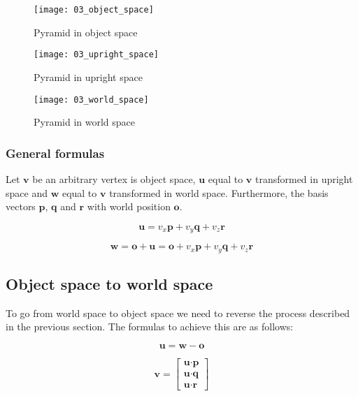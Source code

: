 \begin{figure}[H]
\centering
    \texttt{[image: 03\_object\_space]}
\caption{Pyramid in object space}
\label{fig:pyramid-object-space}
\end{figure}

\begin{figure}[H]
\centering
    \texttt{[image: 03\_upright\_space]}
\caption{Pyramid in upright space}
\label{fig:pyramid-upright-space}
\end{figure}

\begin{figure}[H]
\centering
    \texttt{[image: 03\_world\_space]}
\caption{Pyramid in world space}
\label{fig:pyramid-world-space}
\end{figure}

\subsubsection{General formulas}

Let $\textbf{v}$ be an arbitrary vertex is object space, $\textbf{u}$ equal to $\textbf{v}$ transformed in upright space and $\textbf{w}$ equal to $\textbf{v}$ transformed in world space. Furthermore, the basis vectors $\textbf{p}$, $\textbf{q}$ and $\textbf{r}$ with world position $\textbf{o}$.

$$\textbf{u}=v_x\textbf{p}+v_y\textbf{q}+v_z\textbf{r}$$

$$\textbf{w}=\textbf{o}+\textbf{u}=\textbf{o}+v_x\textbf{p}+v_y\textbf{q}+v_z\textbf{r}$$

\subsection{Object space to world space}

To go from world space to object space we need to reverse the process described in the previous section. The formulas to achieve this are as follows:

$$\textbf{u}=\textbf{w}-\textbf{o}$$

$$\textbf{v}=\begin{bmatrix}
\textbf{u}\cdot\textbf{p} \\ \textbf{u}\cdot\textbf{q} \\ \textbf{u}\cdot\textbf{r}
\end{bmatrix}$$

